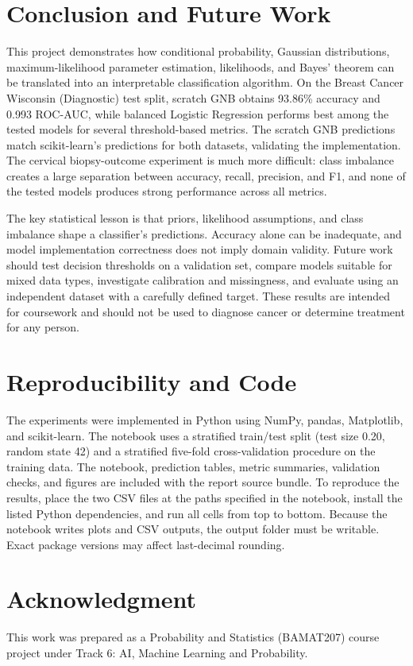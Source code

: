 \documentclass[conference]{IEEEtran}
\begin{document}
\section{Conclusion and Future Work}
This project demonstrates how conditional probability, Gaussian distributions, maximum-likelihood parameter estimation, likelihoods, and Bayes' theorem can be translated into an interpretable classification algorithm. On the Breast Cancer Wisconsin (Diagnostic) test split, scratch GNB obtains 93.86\% accuracy and 0.993 ROC-AUC, while balanced Logistic Regression performs best among the tested models for several threshold-based metrics. The scratch GNB predictions match scikit-learn's predictions for both datasets, validating the implementation. The cervical biopsy-outcome experiment is much more difficult: class imbalance creates a large separation between accuracy, recall, precision, and F1, and none of the tested models produces strong performance across all metrics.

The key statistical lesson is that priors, likelihood assumptions, and class imbalance shape a classifier's predictions. Accuracy alone can be inadequate, and model implementation correctness does not imply domain validity. Future work should test decision thresholds on a validation set, compare models suitable for mixed data types, investigate calibration and missingness, and evaluate using an independent dataset with a carefully defined target. These results are intended for coursework and should not be used to diagnose cancer or determine treatment for any person.

\section*{Reproducibility and Code}
The experiments were implemented in Python using NumPy, pandas, Matplotlib, and scikit-learn. The notebook uses a stratified train/test split (test size 0.20, random state 42) and a stratified five-fold cross-validation procedure on the training data. The notebook, prediction tables, metric summaries, validation checks, and figures are included with the report source bundle. To reproduce the results, place the two CSV files at the paths specified in the notebook, install the listed Python dependencies, and run all cells from top to bottom. Because the notebook writes plots and CSV outputs, the output folder must be writable. Exact package versions may affect last-decimal rounding.

\section*{Acknowledgment}
This work was prepared as a Probability and Statistics (BAMAT207) course project under Track 6: AI, Machine Learning and Probability.
\end{document}

